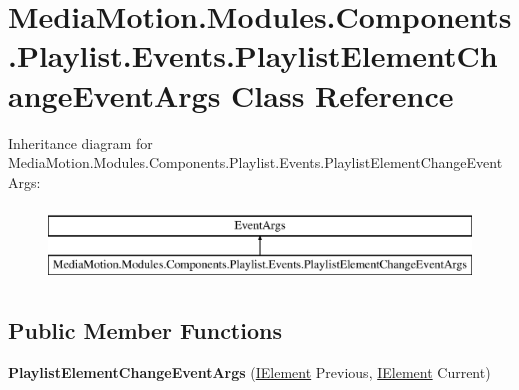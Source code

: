 \hypertarget{class_media_motion_1_1_modules_1_1_components_1_1_playlist_1_1_events_1_1_playlist_element_change_event_args}{\section{Media\+Motion.\+Modules.\+Components.\+Playlist.\+Events.\+Playlist\+Element\+Change\+Event\+Args Class Reference}
\label{class_media_motion_1_1_modules_1_1_components_1_1_playlist_1_1_events_1_1_playlist_element_change_event_args}
}
Inheritance diagram for Media\+Motion.\+Modules.\+Components.\+Playlist.\+Events.\+Playlist\+Element\+Change\+Event\+Args\+:\begin{figure}[H]
\begin{center}
\leavevmode
\includegraphics[height=2.000000cm]{class_media_motion_1_1_modules_1_1_components_1_1_playlist_1_1_events_1_1_playlist_element_change_event_args}
\end{center}
\end{figure}
\subsection*{Public Member Functions}
\begin{DoxyCompactItemize}
\item 
\hypertarget{class_media_motion_1_1_modules_1_1_components_1_1_playlist_1_1_events_1_1_playlist_element_change_event_args_a9f3badd8dff362075840698d866dfdf8}{{\bfseries Playlist\+Element\+Change\+Event\+Args} (\hyperlink{interface_media_motion_1_1_core_1_1_models_1_1_interfaces_1_1_i_element}{I\+Element} Previous, \hyperlink{interface_media_motion_1_1_core_1_1_models_1_1_interfaces_1_1_i_element}{I\+Element} Current)}\label{class_media_motion_1_1_modules_1_1_components_1_1_playlist_1_1_events_1_1_playlist_element_change_event_args_a9f3badd8dff362075840698d866dfdf8}

\end{DoxyCompactItemize}
